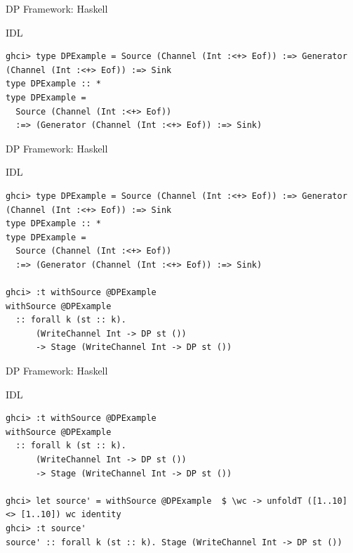 \documentclass{beamer}
\begin{document}
  \begin{frame}[fragile]{DP Framework: Haskell}
    \begin{block}{IDL}
      \begin{verbatim}      
ghci> type DPExample = Source (Channel (Int :<+> Eof)) :=> Generator (Channel (Int :<+> Eof)) :=> Sink
type DPExample :: *
type DPExample =
  Source (Channel (Int :<+> Eof))
  :=> (Generator (Channel (Int :<+> Eof)) :=> Sink)
    \end{verbatim}
  \end{block}
  \end{frame}

  \begin{frame}[fragile]{DP Framework: Haskell}
    \begin{block}{IDL}
      \begin{verbatim}      
ghci> type DPExample = Source (Channel (Int :<+> Eof)) :=> Generator (Channel (Int :<+> Eof)) :=> Sink
type DPExample :: *
type DPExample =
  Source (Channel (Int :<+> Eof))
  :=> (Generator (Channel (Int :<+> Eof)) :=> Sink)
        
ghci> :t withSource @DPExample
withSource @DPExample
  :: forall k (st :: k).
      (WriteChannel Int -> DP st ())
      -> Stage (WriteChannel Int -> DP st ())
    \end{verbatim}
  \end{block}
  \end{frame}

  \begin{frame}[fragile]{DP Framework: Haskell}
    \begin{block}{IDL}
      \begin{verbatim}      
ghci> :t withSource @DPExample
withSource @DPExample
  :: forall k (st :: k).
      (WriteChannel Int -> DP st ())
      -> Stage (WriteChannel Int -> DP st ())
      
ghci> let source' = withSource @DPExample  $ \wc -> unfoldT ([1..10] <> [1..10]) wc identity
ghci> :t source'
source' :: forall k (st :: k). Stage (WriteChannel Int -> DP st ())
    \end{verbatim}
  \end{block}
  \end{frame}
\end{document}
